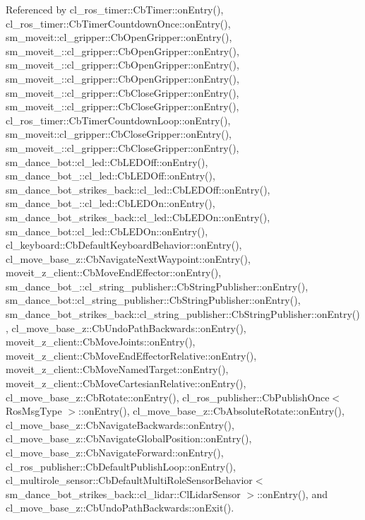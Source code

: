 Referenced by cl\+\_\+ros\+\_\+timer\+::\+Cb\+Timer\+::on\+Entry(), cl\+\_\+ros\+\_\+timer\+::\+Cb\+Timer\+Countdown\+Once\+::on\+Entry(), sm\+\_\+moveit\+::cl\+\_\+gripper\+::\+Cb\+Open\+Gripper\+::on\+Entry(), sm\+\_\+moveit\+\_\+::cl\+\_\+gripper\+::\+Cb\+Open\+Gripper\+::on\+Entry(), sm\+\_\+moveit\+\_\+::cl\+\_\+gripper\+::\+Cb\+Open\+Gripper\+::on\+Entry(), sm\+\_\+moveit\+\_\+::cl\+\_\+gripper\+::\+Cb\+Open\+Gripper\+::on\+Entry(), sm\+\_\+moveit\+\_\+::cl\+\_\+gripper\+::\+Cb\+Close\+Gripper\+::on\+Entry(), sm\+\_\+moveit\+\_\+::cl\+\_\+gripper\+::\+Cb\+Close\+Gripper\+::on\+Entry(), cl\+\_\+ros\+\_\+timer\+::\+Cb\+Timer\+Countdown\+Loop\+::on\+Entry(), sm\+\_\+moveit\+::cl\+\_\+gripper\+::\+Cb\+Close\+Gripper\+::on\+Entry(), sm\+\_\+moveit\+\_\+::cl\+\_\+gripper\+::\+Cb\+Close\+Gripper\+::on\+Entry(), sm\+\_\+dance\+\_\+bot\+::cl\+\_\+led\+::\+Cb\+L\+E\+D\+Off\+::on\+Entry(), sm\+\_\+dance\+\_\+bot\+\_\+::cl\+\_\+led\+::\+Cb\+L\+E\+D\+Off\+::on\+Entry(), sm\+\_\+dance\+\_\+bot\+\_\+strikes\+\_\+back\+::cl\+\_\+led\+::\+Cb\+L\+E\+D\+Off\+::on\+Entry(), sm\+\_\+dance\+\_\+bot\+\_\+::cl\+\_\+led\+::\+Cb\+L\+E\+D\+On\+::on\+Entry(), sm\+\_\+dance\+\_\+bot\+\_\+strikes\+\_\+back\+::cl\+\_\+led\+::\+Cb\+L\+E\+D\+On\+::on\+Entry(), sm\+\_\+dance\+\_\+bot\+::cl\+\_\+led\+::\+Cb\+L\+E\+D\+On\+::on\+Entry(), cl\+\_\+keyboard\+::\+Cb\+Default\+Keyboard\+Behavior\+::on\+Entry(), cl\+\_\+move\+\_\+base\+\_\+z\+::\+Cb\+Navigate\+Next\+Waypoint\+::on\+Entry(), moveit\+\_\+z\+\_\+client\+::\+Cb\+Move\+End\+Effector\+::on\+Entry(), sm\+\_\+dance\+\_\+bot\+\_\+::cl\+\_\+string\+\_\+publisher\+::\+Cb\+String\+Publisher\+::on\+Entry(), sm\+\_\+dance\+\_\+bot\+::cl\+\_\+string\+\_\+publisher\+::\+Cb\+String\+Publisher\+::on\+Entry(), sm\+\_\+dance\+\_\+bot\+\_\+strikes\+\_\+back\+::cl\+\_\+string\+\_\+publisher\+::\+Cb\+String\+Publisher\+::on\+Entry(), cl\+\_\+move\+\_\+base\+\_\+z\+::\+Cb\+Undo\+Path\+Backwards\+::on\+Entry(), moveit\+\_\+z\+\_\+client\+::\+Cb\+Move\+Joints\+::on\+Entry(), moveit\+\_\+z\+\_\+client\+::\+Cb\+Move\+End\+Effector\+Relative\+::on\+Entry(), moveit\+\_\+z\+\_\+client\+::\+Cb\+Move\+Named\+Target\+::on\+Entry(), moveit\+\_\+z\+\_\+client\+::\+Cb\+Move\+Cartesian\+Relative\+::on\+Entry(), cl\+\_\+move\+\_\+base\+\_\+z\+::\+Cb\+Rotate\+::on\+Entry(), cl\+\_\+ros\+\_\+publisher\+::\+Cb\+Publish\+Once$<$ Ros\+Msg\+Type $>$\+::on\+Entry(), cl\+\_\+move\+\_\+base\+\_\+z\+::\+Cb\+Absolute\+Rotate\+::on\+Entry(), cl\+\_\+move\+\_\+base\+\_\+z\+::\+Cb\+Navigate\+Backwards\+::on\+Entry(), cl\+\_\+move\+\_\+base\+\_\+z\+::\+Cb\+Navigate\+Global\+Position\+::on\+Entry(), cl\+\_\+move\+\_\+base\+\_\+z\+::\+Cb\+Navigate\+Forward\+::on\+Entry(), cl\+\_\+ros\+\_\+publisher\+::\+Cb\+Default\+Publish\+Loop\+::on\+Entry(), cl\+\_\+multirole\+\_\+sensor\+::\+Cb\+Default\+Multi\+Role\+Sensor\+Behavior$<$ sm\+\_\+dance\+\_\+bot\+\_\+strikes\+\_\+back\+::cl\+\_\+lidar\+::\+Cl\+Lidar\+Sensor $>$\+::on\+Entry(), and cl\+\_\+move\+\_\+base\+\_\+z\+::\+Cb\+Undo\+Path\+Backwards\+::on\+Exit().


